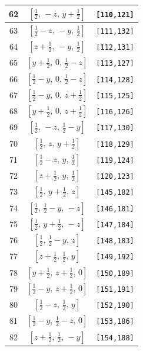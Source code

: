 \documentclass[fleqn,8pt]{jsarticle}
\begin{document}
\begin{longtable}{ccc}
62 & $\left[ \frac{1}{2},\, - z,\, y + \frac{1}{2} \right]$ & {\tt [110,121]} \\ \hline
63 & $\left[ \frac{1}{2} - z,\, - y,\, \frac{1}{2} \right]$ & {\tt [111,132]} \\ \hline
64 & $\left[ z + \frac{1}{2},\, - y,\, \frac{1}{2} \right]$ & {\tt [112,131]} \\ \hline
65 & $\left[ y + \frac{1}{2},\, 0,\, \frac{1}{2} - z \right]$ & {\tt [113,127]} \\ \hline
66 & $\left[ \frac{1}{2} - y,\, 0,\, \frac{1}{2} - z \right]$ & {\tt [114,128]} \\ \hline
67 & $\left[ \frac{1}{2} - y,\, 0,\, z + \frac{1}{2} \right]$ & {\tt [115,125]} \\ \hline
68 & $\left[ y + \frac{1}{2},\, 0,\, z + \frac{1}{2} \right]$ & {\tt [116,126]} \\ \hline
69 & $\left[ \frac{1}{2},\, - z,\, \frac{1}{2} - y \right]$ & {\tt [117,130]} \\ \hline
70 & $\left[ \frac{1}{2},\, z,\, y + \frac{1}{2} \right]$ & {\tt [118,129]} \\ \hline
71 & $\left[ \frac{1}{2} - z,\, y,\, \frac{1}{2} \right]$ & {\tt [119,124]} \\ \hline
72 & $\left[ z + \frac{1}{2},\, y,\, \frac{1}{2} \right]$ & {\tt [120,123]} \\ \hline
73 & $\left[ \frac{1}{2},\, y + \frac{1}{2},\, z \right]$ & {\tt [145,182]} \\ \hline
74 & $\left[ \frac{1}{2},\, \frac{1}{2} - y,\, - z \right]$ & {\tt [146,181]} \\ \hline
75 & $\left[ \frac{1}{2},\, y + \frac{1}{2},\, - z \right]$ & {\tt [147,184]} \\ \hline
76 & $\left[ \frac{1}{2},\, \frac{1}{2} - y,\, z \right]$ & {\tt [148,183]} \\ \hline
77 & $\left[ z + \frac{1}{2},\, \frac{1}{2},\, y \right]$ & {\tt [149,192]} \\ \hline
78 & $\left[ y + \frac{1}{2},\, z + \frac{1}{2},\, 0 \right]$ & {\tt [150,189]} \\ \hline
79 & $\left[ \frac{1}{2} - y,\, z + \frac{1}{2},\, 0 \right]$ & {\tt [151,191]} \\ \hline
80 & $\left[ \frac{1}{2} - z,\, \frac{1}{2},\, y \right]$ & {\tt [152,190]} \\ \hline
81 & $\left[ \frac{1}{2} - y,\, \frac{1}{2} - z,\, 0 \right]$ & {\tt [153,186]} \\ \hline
82 & $\left[ z + \frac{1}{2},\, \frac{1}{2},\, - y \right]$ & {\tt [154,188]} \\ \hline

\end{longtable}
\end{document}

